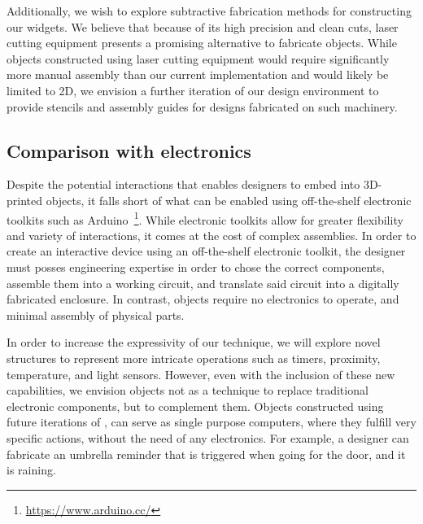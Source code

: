        Additionally, we wish to explore subtractive fabrication methods for
        constructing our widgets. We believe that because of its high precision
        and clean cuts, laser cutting equipment presents a promising alternative
        to fabricate \al objects. While \al objects constructed using laser
        cutting equipment would require significantly more manual assembly than
        our current implementation and would likely be limited to 2D, we
        envision a further iteration of our design environment to provide
        stencils and assembly guides for \al designs fabricated on such
        machinery.
        
      \subsection{Comparison with electronics}
        Despite the potential interactions that \al enables designers to
        embed into 3D-printed objects, it falls short of what can be
        enabled using off-the-shelf electronic toolkits such as
        Arduino~\footnote{\url{https://www.arduino.cc/}}. While electronic
        toolkits allow for greater flexibility and variety of interactions,
        it comes at the cost of complex assemblies. In order to create an
        interactive device using an off-the-shelf electronic toolkit, the
        designer must posses engineering expertise in order to chose the
        correct components, assemble them into a working circuit, and
        translate said circuit into a digitally fabricated enclosure. In
        contrast, \al objects require no electronics to operate, and
        minimal assembly of physical parts.
        
        In order to increase the expressivity of our technique, we will
        explore novel structures to represent more intricate operations
        such as timers, proximity, temperature, and light sensors. However,
        even with the inclusion of these new capabilities, we envision \al
        objects not as a technique to replace traditional electronic
        components, but to complement them. Objects constructed using
        future iterations of \al, can serve as single purpose computers,
        where they fulfill very specific actions, without the need of any
        electronics. For example, a designer can fabricate an umbrella
        reminder that is triggered when going for the door, and it is
        raining.


